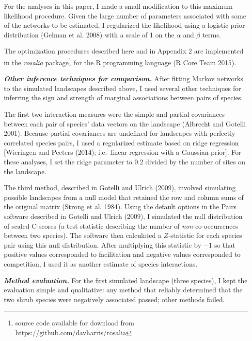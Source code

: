 \documentclass[12pt,]{article}
\begin{document}
\begin{spacing}{1.9}
\begin{flushleft}
For the analyses in this paper, I made a small modification to this
maximum likelihood procedure. Given the large number of parameters
associated with some of the networks to be estimated, I regularized the
likelihood using a logistic prior distribution (Gelman et al. 2008) with
a scale of 1 on the \(\alpha\) and \(\beta\) terms.

The optimization procedures described here and in Appendix 2 are
implemented in the \emph{rosalia} package\footnote{source code available
  for download from https://github.com/davharris/rosalia} for the R
programming language (R Core Team 2015).

\textbf{\emph{Other inference techniques for comparison.}} After fitting
Markov networks to the simulated landscapes described above, I used
several other techniques for inferring the sign and strength of marginal
associations between pairs of species.

The first two interaction measures were the simple and partial
covariances between each pair of species' data vectors on the landscape
(Albrecht and Gotelli 2001). Because partial covariances are undefined
for landscapes with perfectly-correlated species pairs, I used a
regularized estimate based on ridge regression {[}Wieringen and Peeters
(2014); i.e.~linear regression with a Gaussian prior{]}. For these
analyses, I set the ridge parameter to 0.2 divided by the number of
sites on the landscape.

The third method, described in Gotelli and Ulrich (2009), involved
simulating possible landscapes from a null model that retained the row
and column sums of the original matrix (Strong et al. 1984). Using the
default options in the Pairs software described in Gotelli and Ulrich
(2009), I simulated the null distribution of scaled C-scores (a test
statistic describing the number of \emph{non}-co-occurrences between two
species). The software then calculated a \(Z\)-statistic for each
species pair using this null distribution. After multiplying this
statistic by \(-1\) so that positive values corresponded to facilitation
and negative values corresponded to competition, I used it as another
estimate of species interactions.

\textbf{\emph{Method evaluation.}} For the first simulated landscape
(three species), I kept the evaluation simple and qualitative: any
method that reliably determined that the two shrub species were
negatively associated passed; other methods failed.


\end{flushleft}
\end{spacing}
\end{document}

